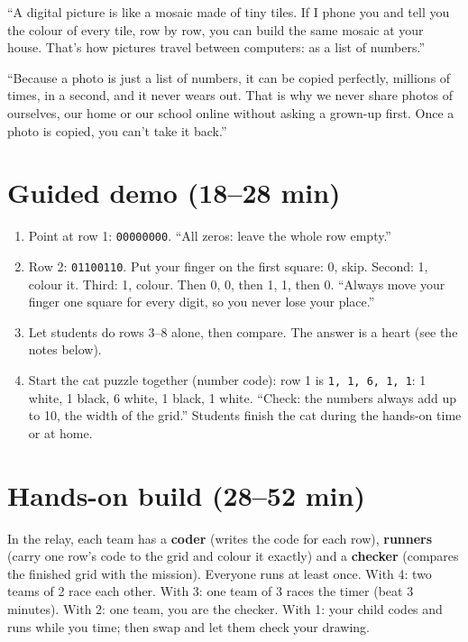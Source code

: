 \begin{analogy}[A mosaic]
\enquote{A digital picture is like a mosaic made of tiny tiles. If I phone you and tell you the colour of every tile, row by row, you can build the same mosaic at your house. That's how pictures travel between computers: as a list of numbers.}
\end{analogy}

\begin{safety}
\enquote{Because a photo is just a list of numbers, it can be copied perfectly, millions of times, in a second, and it never wears out. That is why we never share photos of ourselves, our home or our school online without asking a grown-up first. Once a photo is copied, you can't take it back.}
\end{safety}

\section{Guided demo (18--28 min)}
\begin{workedexample}
\begin{enumerate}[leftmargin=1.4em,itemsep=1pt]
  \item Point at row 1: \texttt{00000000}. \enquote{All zeros: leave the whole row empty.}
  \item Row 2: \texttt{01100110}. Put your finger on the first square: 0, skip. Second: 1, colour it. Third: 1, colour. Then 0, 0, then 1, 1, then 0. \enquote{Always move your finger one square for every digit, so you never lose your place.}
  \item Let students do rows 3--8 alone, then compare. The answer is a heart (see the notes below).
  \item Start the cat puzzle together (number code): row 1 is \texttt{1, 1, 6, 1, 1}: 1 white, 1 black, 6 white, 1 black, 1 white. \enquote{Check: the numbers always add up to 10, the width of the grid.} Students finish the cat during the hands-on time or at home.
\end{enumerate}
\end{workedexample}

\section{Hands-on build (28--52 min)}
\begin{pairroles}
In the relay, each team has a \textbf{coder} (writes the code for each row), \textbf{runners} (carry one row's code to the grid and colour it exactly) and a \textbf{checker} (compares the finished grid with the mission). Everyone runs at least once. With 4: two teams of 2 race each other. With 3: one team of 3 races the timer (beat 3 minutes). With 2: one team, you are the checker. With 1: your child codes and runs while you time; then swap and let them check your drawing.
\end{pairroles}

